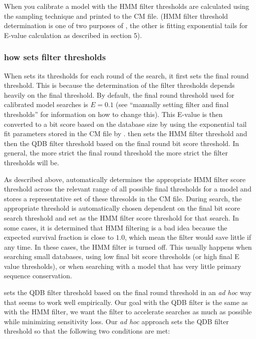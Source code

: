 When you calibrate a model with  the HMM filter
thresholds are calculated using the sampling technique and printed to
the CM file. (HMM filter threshold determination is one of two
purposes of , the other is fitting exponential tails
for E-value calculation as described in section 5).

\subsubsection{how  sets filter thresholds}
When  sets its thresholds for each round of the
search, it first sets the final round threshold. This is because the
determination of the filter thresholds depends heavily on the final
threshold. By default, the final round threshold used for calibrated
model searches is $E=0.1$ (see ``manually setting filter and final
thresholds'' for information on how to change this). 
This E-value is then converted to a bit score based on the database
size by using the exponential tail fit parameters stored in the CM
file by .  then sets the HMM filter
threshold and then the QDB filter threshold based on the final round
bit score threshold. In general, the more strict the final round
threshold the more strict the filter thresholds will be. 

As described above,  automatically determines the
appropriate HMM filter score threshold across the relevant range of
all possible final thresholds for a model and stores a representative
set of these thresolds in the CM file. During search, the appropriate
threshold is automatically chosen dependent on the final bit score
search threshold and set as the HMM filter score threshold for that
search.
In some cases, it is determined that HMM filtering is a
bad idea because the expected survival fraction is close to $1.0$,
which mean the filter would save little if any time. In these cases,
the HMM filter is turned off. This usually happens when searching
small databases, using low final bit score thresholds (or high final E
value thresholds), or when searching with a model that has very little
primary sequence conservation.

 sets the QDB filter threshold based on the final round
threshold in an \emph{ad hoc} way that seems to work well
empirically. Our goal with the QDB filter is the same as with the HMM
filter, we want the filter to accelerate searches as much as possible
while minimizing sensitivity loss. Our \emph{ad hoc} approach 
sets the QDB filter threshold so that the following two conditions are
met:


